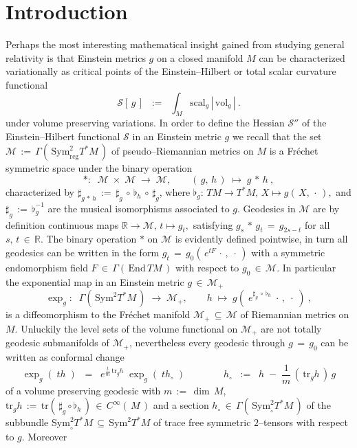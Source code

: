 \documentclass[12pt]{article}
\def\#{\sharp}
\def\b{\flat}
\def\End{\mathrm{End}}
\def\EH{\mathcal{S}}
\def\M{\mathscr{M}}
\def\R{\mathbb{R}}
\def\S{\mathrm{Sym}}
\def\scal{\mathrm{scal}}
\def\tr{\mathrm{tr}}
\def\vol{\mathrm{vol}}
\begin{document}
\section{Introduction}
\label{intro}
%
 Perhaps the most interesting mathematical insight gained from studying general
 relativity is that Einstein metrics $g$ on a closed manifold $M$ can be
 characterized variationally as critical points of the Einstein--Hilbert
 or total scalar curvature functional
 $$
  \EH[\,g\,]
  \;\;:=\;\;
  \int_M\scal_g\,|\,\vol_g\,|\ .
 $$
 under volume preserving variations. In order to define the Hessian $\EH''$
 of the Einstein--Hilbert functional $\EH$ in an Einstein metric $g$ we
 recall that the set $\M\,:=\,\Gamma(\,\S^2_{\mathrm{reg}}T^*M\,)$ of
 pseudo--Riemannian metrics on $M$ is a Fréchet symmetric space under
 the binary operation
 $$
  *:\;\;\M\;\times\;\M\;\longrightarrow\;\M,\qquad
  (\,g,\,h\,)\;\longmapsto\;g\,*\,h\ ,
 $$
 characterized by $\#_{g\,*\,h}\,:=\,\#_g\,\circ\,\b_h\,\circ\,\#_g$,
 where $\b_g:\,TM\longrightarrow T^*M,\,X\longmapsto g(\,X,\,\cdot\,),$
 and $\#_g\,:=\,\b^{-1}_g$ are the musical isomorphisms associated to $g$.
 Geodesics in $\M$ are by definition continuous maps $\R\longrightarrow\M,
 \,t\longmapsto g_t,$ satisfying $g_s\,*\,g_t\,=\,g_{2s-t}$ for all
 $s,\,t\,\in\,\R$. The binary operation $*$ on $\M$ is evidently defined
 pointwise, in turn all geodesics can be written in the form $g_t\,=\,g_0
 (\,e^{tF}\,\cdot\,,\;\cdot\,)$ with a symmetric endomorphism field
 $F\,\in\,\Gamma(\,\End\,TM\,)$ with respect to $g_0\,\in\,\M$. In
 particular the exponential map in an Einstein metric $g\,\in\,\M_+$
 \begin{equation}\label{gexp}
  \exp_g:\;\;\Gamma(\,\S^2T^*M\,)\;\longrightarrow\;\M_+,\qquad
  h\;\longmapsto\;g(\;e^{\#_g\,\circ\,\b_h}\;\cdot\,,\;\cdot\;)\ ,
 \end{equation}
 is a diffeomorphism to the Fréchet manifold $\M_+\,\subseteq\,\M$
 of Riemannian metrics on $M$. Unluckily the level sets of the volume
 functional on $\M_+$ are not totally geodesic submanifolds of $\M_+$,
 nevertheless every geodesic through $g\,=\,g_0$ can be written as
 conformal change
 $$
  \exp_g(\;th\;)
  \;\;=\;\;
  e^{\frac tm\,\tr_gh}
  \;\exp_g(\;th_\circ\;)
  \qquad\qquad
  h_\circ
  \;\;:=\;\;
  h\;-\;\frac1m\,(\,\tr_gh\,)\,g
 $$
 of a volume preserving geodesic with $m\,:=\,\dim\,M$, $\tr_gh\,:=\,
 \tr(\,\#_g\circ\b_h\,)\,\in\,C^\infty(\,M\,)$ and a section $h_\circ\,\in\,
 \Gamma(\,\S^2_\circ T^*M\,)$ of the subbundle $\S^2_\circ T^*M\,\subseteq\,
 \S^2T^*M$ of trace free symmetric $2$--tensors with respect to $g$. Moreover
\end{document}
